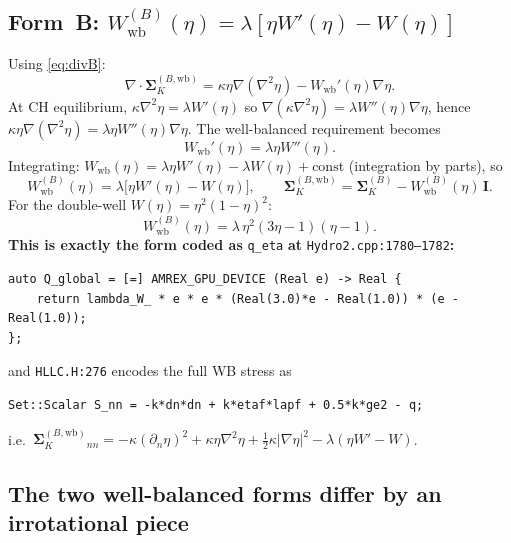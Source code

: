 \documentclass[11pt]{article}
\newcommand{\dive}{\nabla\!\cdot\!}
\newcommand{\grad}{\nabla}
\newcommand{\II}{\mathbf{I}}
\newcommand{\SK}{\boldsymbol{\Sigma}_K}
\newcommand{\dxn}{\partial_n}
\newcommand{\Wb}{W_{\!\mathrm{wb}}}
\begin{document}
\subsection{Form~B: \texorpdfstring{$\Wb^{(B)}(\eta) = \lambda[\eta W'(\eta)-W(\eta)]$}{Wb(B) = lambda(eta W' - W)}}

Using \eqref{eq:divB}:
\begin{equation}
\dive\SK^{(B,\mathrm{wb})} = \kappa\eta\grad(\grad^2\eta) - \Wb'(\eta)\grad\eta.
\end{equation}
At CH equilibrium, $\kappa\grad^2\eta = \lambda W'(\eta)$ so
$\grad(\kappa\grad^2\eta) = \lambda W''(\eta)\grad\eta$, hence
$\kappa\eta\grad(\grad^2\eta) = \lambda\eta W''(\eta)\grad\eta$.
The well-balanced requirement becomes
\begin{equation}
\Wb'(\eta) = \lambda\eta W''(\eta).
\end{equation}
Integrating: $\Wb(\eta) = \lambda\eta W'(\eta) - \lambda W(\eta) + \mathrm{const}$
(integration by parts), so
\begin{equation}
\boxed{\,\Wb^{(B)}(\eta) = \lambda\big[\eta W'(\eta) - W(\eta)\big],\qquad
\SK^{(B,\mathrm{wb})} = \SK^{(B)} - \Wb^{(B)}(\eta)\,\II.\,}
\label{eq:Bwb}
\end{equation}
For the double-well $W(\eta)=\eta^2(1-\eta)^2$:
\begin{equation}
\Wb^{(B)}(\eta) = \lambda\,\eta^2(3\eta-1)(\eta-1).
\label{eq:Wb_explicit}
\end{equation}
\textbf{This is exactly the form coded as} \texttt{q\_eta} \textbf{at} \texttt{Hydro2.cpp:1780--1782}\textbf{:}
\begin{lstlisting}
auto Q_global = [=] AMREX_GPU_DEVICE (Real e) -> Real {
    return lambda_W_ * e * e * (Real(3.0)*e - Real(1.0)) * (e - Real(1.0));
};
\end{lstlisting}
and \texttt{HLLC.H:276} encodes the full WB stress as
\begin{lstlisting}
Set::Scalar S_nn = -k*dn*dn + k*etaf*lapf + 0.5*k*ge2 - q;
\end{lstlisting}
i.e.\ $\SK^{(B,\mathrm{wb})}_{nn} = -\kappa(\dxn\eta)^2 + \kappa\eta\grad^2\eta + \tfrac12\kappa|\grad\eta|^2 - \lambda(\eta W' - W)$.

\subsection{The two well-balanced forms differ by an irrotational piece}
\end{document}
